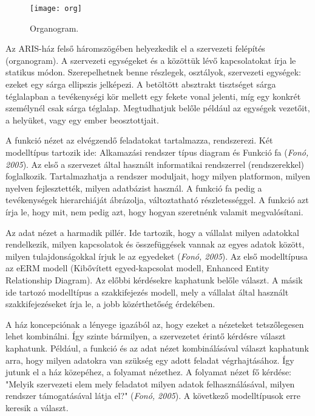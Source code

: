 \documentclass[12pt]{article}
\begin{document}
\begin{figure}
\centering
\texttt{[image: org]}
\caption{Organogram.}
\end{figure}

Az ARIS-ház felső háromszögében helyezkedik el a szervezeti felépítés (organogram). A szervezeti egységeket és a közöttük lévő kapcsolatokat írja le statikus módon. Szerepelhetnek benne részlegek, osztályok, szervezeti egységek: ezeket egy sárga ellipszis jelképezi. A betöltött absztrakt tisztséget sárga téglalapban a tevékenységi kör mellett egy fekete vonal jelenti, míg egy konkrét személynél csak sárga téglalap. Megtudhatjuk belőle például az egységek vezetőit, a helyüket, vagy egy ember beosztottjait.



A funkció nézet az elvégzendő feladatokat tartalmazza, rendszerezi. Két modelltípus tartozik ide: Alkamazási rendszer típus diagram és Funkció fa  (\textit{Fonó, 2005}). Az első a szervezet által használt informatikai rendszerrel (rendszerekkel) foglalkozik. Tartalmazhatja a rendszer moduljait, hogy milyen platformon, milyen nyelven fejlesztették, milyen adatbázist használ. A funkció fa pedig a tevékenységek hierarchiáját ábrázolja, változtatható részletességgel. A funkció azt írja le, hogy mit, nem pedig azt, hogy hogyan szeretnénk valamit megvalósítani.

Az adat nézet a harmadik pillér. Ide tartozik, hogy a vállalat milyen adatokkal rendelkezik, milyen kapcsolatok és összefüggések vannak az egyes adatok között, milyen tulajdonságokkal írjuk le az egyedeket  (\textit{Fonó, 2005}). Az első modelltípusa az eERM modell (Kibővített egyed-kapcsolat modell, Enhanced Entity Relationship Diagram). Az előbbi kérdésekre kaphatunk belőle választ. A másik ide tartozó modelltípus a szakkifejezés modell, mely a vállalat által használt szakkifejezéseket írja le, a jobb közérthetőség érdekében.

A ház koncepciónak a lényege igazából az, hogy ezeket a nézeteket tetszőlegesen lehet kombinálni. Így szinte bármilyen, a szervezetet érintő kérdésre választ kaphatunk. Például, a funkció és az adat nézet kombinálásával választ kaphatunk arra, hogy milyen adatokra van szükség egy adott feladat végrhajtásához. Így jutunk el a ház közepéhez, a folyamat nézethez. A folyamat nézet fő kérdése: "Melyik szervezeti elem mely feladatot milyen adatok felhasználásával, milyen rendszer támogatásával látja el?"  (\textit{Fonó, 2005}). A következő modelltípusok erre keresik a választ.
\end{document}
